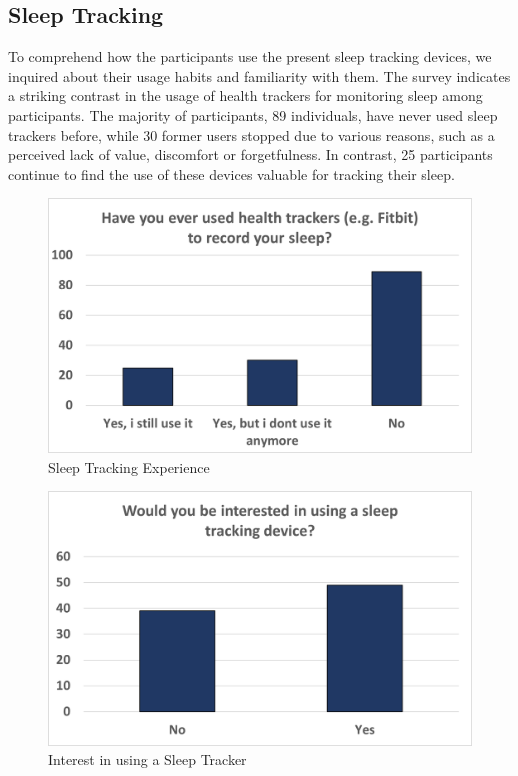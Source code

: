 \documentclass[
  a4paper,  %
  twoside,  %
  bibliography=totoc,
  headsepline,
  cleardoublepage=empty,
  parskip=half,
  draft=false
]{scrbook}
\begin{document}
\subsection{Sleep Tracking}
To comprehend how the participants use the present sleep tracking devices, we inquired about their usage habits and familiarity with them. The survey indicates a striking contrast in the usage of health trackers for monitoring sleep among participants. The majority of participants, 89 individuals, have never used sleep trackers before, while 30 former users stopped due to various reasons, such as a perceived lack of value, discomfort or forgetfulness. In contrast, 25 participants continue to find the use of these devices valuable for tracking their sleep.

\begin{figure}[H]
    \centering
    \includegraphics[scale=0.8]{graphics/Used_Sleep_Tracking.png}
    \caption{Sleep Tracking Experience}
    \label{fig:tracking_experience}
\end{figure}

\begin{figure}[H]
    \centering
    \includegraphics[scale=0.8]{graphics/Interested_in_Using.png}
    \caption{Interest in using a Sleep Tracker}
    \label{fig:interest_using}
\end{figure}
\end{document}
